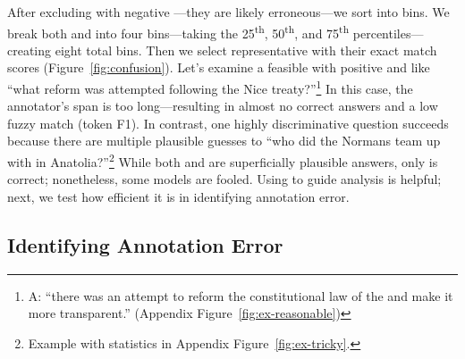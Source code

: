 After excluding \itms{} with negative \discability{}---they are
likely erroneous---we sort \itms{} into bins.
We break both \diff{} and \discability{} into four bins---taking the 25\textsuperscript{th},
50\textsuperscript{th}, and 75\textsuperscript{th}
percentiles---creating eight total bins.
Then we select representative \squad{} \subjs{} with their
exact match scores (Figure~\ref{fig:confusion}).
Let's examine a feasible \itm{} with positive \diff{} and \discability{} like ``what reform was attempted following the Nice treaty?''\footnote{
    A: ``there was an attempt to reform the constitutional law of the  and make it more transparent.'' (Appendix Figure~\ref{fig:ex-reasonable})
}
In this case, the annotator's span is too long---resulting in almost
no correct answers and a low fuzzy match (token F1).
In contrast, one highly discriminative question succeeds because there
are multiple plausible guesses to ``who did the Normans team up with
in Anatolia?''\footnote{ Example with statistics in Appendix
    Figure~\ref{fig:ex-tricky}.
}
While both  and  are
superficially plausible answers, only  is correct;
nonetheless, some models are fooled.
Using \irt{} to guide \subj{} analysis is helpful; next, we test how
efficient it is in identifying annotation error.

\subsection{Identifying Annotation Error}

